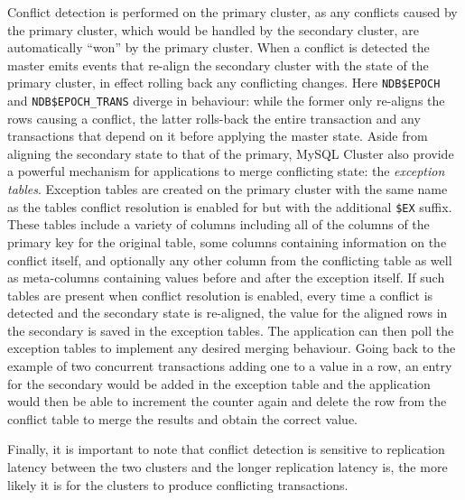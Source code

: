 Conflict detection is performed on the primary cluster, as any conflicts caused by the primary cluster, which would be handled by the secondary cluster, are automatically ``won'' by the primary cluster.
When a conflict is detected the master emits events that re-align the secondary cluster with the state of the primary cluster, in effect rolling back any conflicting changes.
Here \texttt{NDB\$EPOCH} and \texttt{NDB\$EPOCH\_TRANS} diverge in behaviour: while the former only re-aligns the rows causing a conflict, the latter rolls-back the entire transaction and any transactions that depend on it before applying the master state.
Aside from aligning the secondary state to that of the primary, MySQL Cluster also provide a powerful mechanism for applications to merge conflicting state: the \emph{exception tables}.
Exception tables are created on the primary cluster with the same name as the tables conflict resolution is enabled for but with the additional \texttt{\$EX} suffix.
These tables include a variety of columns including all of the columns of the primary key for the original table, some columns containing information on the conflict itself, and optionally any other column from the conflicting table as well as meta-columns containing values before and after the exception itself.
If such tables are present when conflict resolution is enabled, every time a conflict is detected and the secondary state is re-aligned, the value for the aligned rows in the secondary is saved in the exception tables.
The application can then poll the exception tables to implement any desired merging behaviour.
Going back to the example of two concurrent transactions adding one to a value in a row, an entry for the secondary would be added in the exception table and the application would then be able to increment the counter again and delete the row from the conflict table to merge the results and obtain the correct value.

Finally, it is important to note that conflict detection is sensitive to replication latency between the two clusters and the longer replication latency is, the more likely it is for the clusters to produce conflicting transactions.
